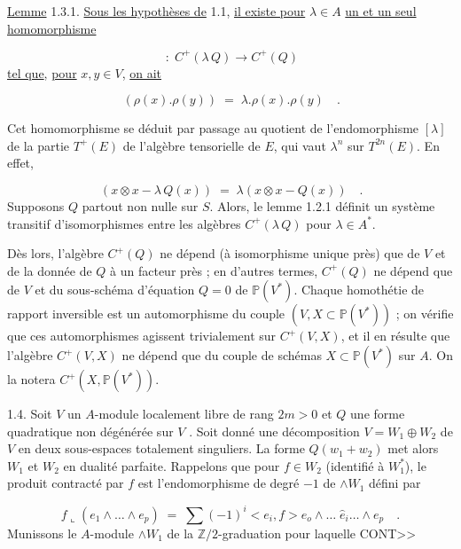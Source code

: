 \underline{Lemme} 1.3.1. \underline{Sous les hypothèses de} 1.1, \underline{il existe pour} $\lambda \in A$ \underline{un et un seul homomorphisme}

\begin{equation*}
[\lambda] \;:\; C^{+}(\lambda\, Q) \longrightarrow C^{+}(Q)
\end{equation*}
\underline{tel que}, \underline{pour} $x, y \in V$, \underline{on ait}

\begin{equation*}
[\lambda]\,(\rho(x).\rho(y)) \;=\; \lambda.\rho(x).\rho(y) \quad .
\end{equation*}


Cet homomorphisme se déduit par passage au quotient de l'endomorphisme $[\lambda]$ de la partie $T^{+}(E)$ de l'algèbre tensorielle de $E$, qui vaut $\lambda^{n}$ sur $T^{2n}(E)$. En effet,

\begin{equation*}
[\lambda]\,(x \otimes x - \lambda\, Q(x)) \;=\; \lambda(x \otimes x - Q(x)) \quad .
\end{equation*}
Supposons $Q$ partout non nulle sur $S$. Alors, le lemme 1.2.1 définit un système transitif d'isomorphismes entre les algèbres $C^{+}(\lambda\, Q)$ pour $\lambda \in A^{*}$.

Dès lors, l'algèbre $C^{+}(Q)$ ne dépend (à isomorphisme unique près) que de $V$ et de la donnée de $Q$ à un facteur près ; en d'autres termes, $C^{+}(Q)$ ne dépend que de $V$ et du sous-schéma d'équation $Q = 0$ de $\mathbb{P}(V^{*})$. Chaque homothétie de rapport inversible est un automorphisme du couple $(V, X \subset \mathbb{P}(V^{*}))$ ; on vérifie que ces automorphismes agissent trivialement sur $C^{+}(V, X)$, et il en résulte que l'algèbre $C^{+}(V, X)$ ne dépend que du couple de schémas $X \subset \mathbb{P}(V^{*})$ sur $A$. On la notera $C^{+}(X, \mathbb{P}(V^{*}))$.

1.4. Soit $V$ un $A$-module localement libre de rang $2m > 0$ et $Q$ une forme quadratique non dégénérée sur $V$ . Soit donné une décomposition $V = W_1 \oplus W_2$ de $V$ en deux sous-espaces totalement singuliers. La forme $Q(w_1 + w_2)$ met alors $W_1$ et $W_2$ en dualité parfaite. Rappelons que pour $f \in W_2$ (identifié à $W_1^{*}$), le produit contracté par $f$ est l'endomorphisme de degré $-1$ de $\wedge W_1$ défini par

\begin{equation*}
f \llcorner (e_1 \wedge \ldots \wedge e_p) \;=\; \sum (-1)^{i} < e_i , f > e_o \wedge \ldots \; \hat{e}_i \ldots \wedge e_p \quad .
\end{equation*}
Munissons le $A$-module $\wedge W_1$ de la $\mathbb{Z}/2$-graduation pour laquelle CONT>>


